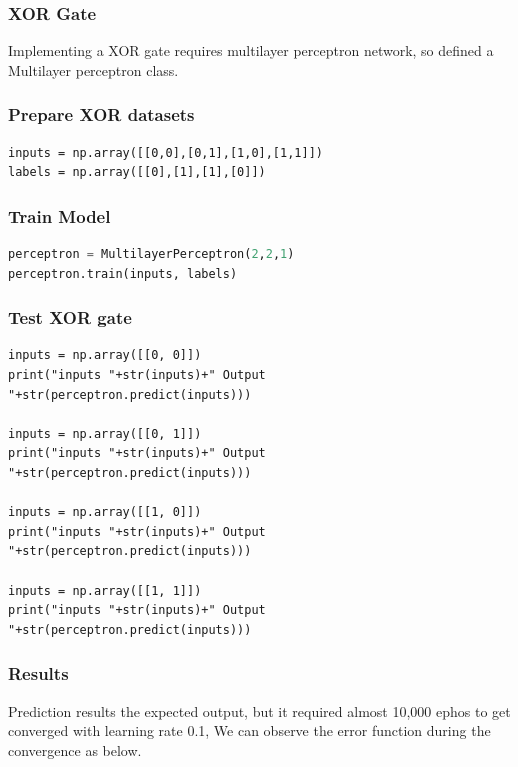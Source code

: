 \documentclass[a4paper,12pt]{report}
\begin{document}
\subsubsection*{XOR Gate}
Implementing a XOR gate requires multilayer perceptron network, so defined a Multilayer perceptron class.


\subsubsection*{Prepare XOR datasets}
\begin{lstlisting}
inputs = np.array([[0,0],[0,1],[1,0],[1,1]])
labels = np.array([[0],[1],[1],[0]])
\end{lstlisting}

\subsubsection*{Train Model}
\begin{lstlisting}[language=python]
perceptron = MultilayerPerceptron(2,2,1)
perceptron.train(inputs, labels)
\end{lstlisting}


\subsubsection*{Test XOR gate}
\begin{lstlisting}
inputs = np.array([[0, 0]])
print("inputs "+str(inputs)+" Output "+str(perceptron.predict(inputs)))

inputs = np.array([[0, 1]])
print("inputs "+str(inputs)+" Output "+str(perceptron.predict(inputs)))

inputs = np.array([[1, 0]])
print("inputs "+str(inputs)+" Output "+str(perceptron.predict(inputs)))

inputs = np.array([[1, 1]])
print("inputs "+str(inputs)+" Output "+str(perceptron.predict(inputs)))
\end{lstlisting}


\subsubsection*{Results}
Prediction results the expected output, but it required almost 10,000 ephos to get converged with learning rate 0.1, We can observe the error function during the convergence as below. 
\end{document}
